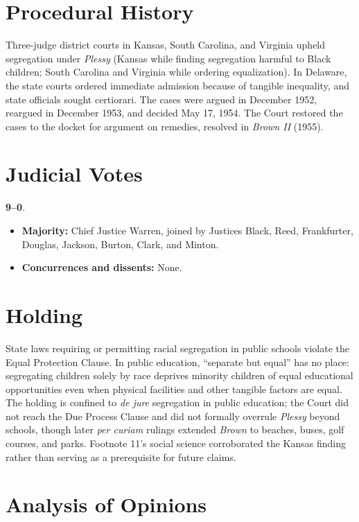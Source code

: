 \documentclass[12pt]{article}
\begin{document}
\section{Procedural History}

Three-judge district courts in Kansas, South Carolina, and Virginia upheld segregation under \textit{Plessy} (Kansas while finding segregation harmful to Black children; South Carolina and Virginia while ordering equalization). In Delaware, the state courts ordered immediate admission because of tangible inequality, and state officials sought certiorari. The cases were argued in December 1952, reargued in December 1953, and decided May 17, 1954. The Court restored the cases to the docket for argument on remedies, resolved in \textit{Brown II} (1955).

\section{Judicial Votes}

\textbf{9--0}.
\begin{itemize}
\item \textbf{Majority:} Chief Justice Warren, joined by Justices Black, Reed, Frankfurter, Douglas, Jackson, Burton, Clark, and Minton.
\item \textbf{Concurrences and dissents:} None.
\end{itemize}

\section{Holding}

State laws requiring or permitting racial segregation in public schools violate the Equal Protection Clause. In public education, ``separate but equal'' has no place: segregating children solely by race deprives minority children of equal educational opportunities even when physical facilities and other tangible factors are equal. The holding is confined to \textit{de jure} segregation in public education; the Court did not reach the Due Process Clause and did not formally overrule \textit{Plessy} beyond schools, though later \textit{per curiam} rulings extended \textit{Brown} to beaches, buses, golf courses, and parks. Footnote 11's social science corroborated the Kansas finding rather than serving as a prerequisite for future claims.

\section{Analysis of Opinions}
\end{document}
